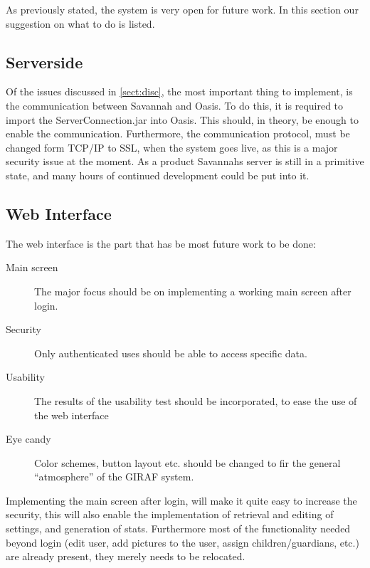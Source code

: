 As previously stated, the system is very open for future work. In this section our suggestion on what to do is listed.

\subsection*{Serverside}
Of the issues discussed in \autoref{sect:disc}, 
the most important thing to implement, is the communication between Savannah and Oasis. To do this, it is required to import the ServerConnection.jar into Oasis. This should, in theory, be enough to enable the communication. Furthermore, the communication protocol, must be changed form TCP/IP to SSL, when the system goes live, as this is a major security issue at the moment.
As a product Savannahs server is still in a primitive state, and many hours of continued development could be put into it.


\subsection*{Web Interface}
The web interface is the part that has be most future work to be done:
\begin{description}
	\item[Main screen] The major focus should be on implementing a working main screen after login.
	\item[Security] Only authenticated uses should be able to access specific data.
	\item[Usability] The results of the usability test should be incorporated, to ease the use of the web interface
	\item[Eye candy] Color schemes, button layout etc. should be changed to fir the general ``atmosphere'' of the GIRAF system.
\end{description}
Implementing the main screen after login, will make it quite easy to increase the security, this will also enable the implementation of retrieval and editing of settings, and generation of stats. Furthermore most of the functionality needed beyond login (edit user, add pictures to the user, assign children/guardians, etc.) are already present, they merely needs to be relocated.